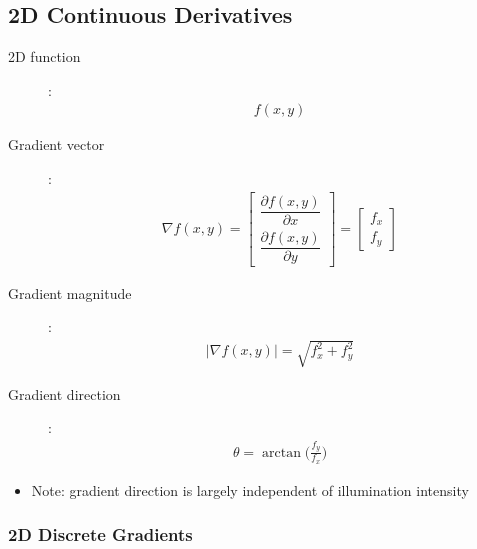 \documentclass[letterpaper,12pt]{article}
\newcommand{\abs}[1]{\lvert#1\rvert}
\begin{document}
\subsection{2D Continuous Derivatives}
\begin{description}
 \item[2D function]:
       \begin{align}
        f(x,y)
       \end{align}
 \item[Gradient vector]:
       \begin{align}
        \nabla f(x,y) =
        \begin{bmatrix}
         \dfrac{\partial f(x,y)}{\partial x} \\[3ex]
         \dfrac{\partial f(x,y)}{\partial y}
        \end{bmatrix}
        = \begin{bmatrix}
         f_x \\
         f_y
        \end{bmatrix}
       \end{align}
 \item[Gradient magnitude]:
       \begin{align}
        \abs{\nabla f(x,y)} = \sqrt{f_x^2 + f_y^2}
       \end{align}
 \item[Gradient direction]:
       \begin{align}
        \theta = \arctan\bigg(\frac{f_y}{f_x}\bigg)
       \end{align}
\end{description}
\begin{itemize}
 \item Note: gradient direction is largely independent of illumination intensity
\end{itemize}

\subsubsection{2D Discrete Gradients}
\end{document}
